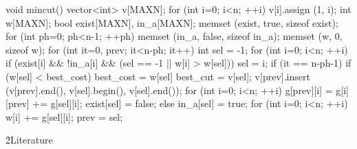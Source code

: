 void mincut() {
vector<int> v[MAXN];
for (int i=0; i<n; ++i)
v[i].assign (1, i);
int w[MAXN];
bool exist[MAXN], in_a[MAXN];
memset (exist, true, sizeof exist);
for (int ph=0; ph<n-1; ++ph) {
memset (in_a, false, sizeof in_a);
memset (w, 0, sizeof w);
for (int it=0, prev; it<n-ph; it++) {
int sel = -1;
for (int i=0; i<n; ++i)
if (exist[i] && !in_a[i] && (sel == -1 || w[i] > w[sel]))
sel = i;
if (it == n-ph-1) {
if (w[sel] < best_cost)
best_cost = w[sel] best_cut = v[sel];
v[prev].insert (v[prev].end(), v[sel].begin(), v[sel].end());
for (int i=0; i<n; ++i)
g[prev][i] = g[i][prev] += g[sel][i];
exist[sel] = false;
}
else {
in_a[sel] = true;
for (int i=0; i<n; ++i)
w[i] += g[sel][i];
prev = sel;
}
}
}
}
\endcode


\h2{Literature}

\ul{
\li {}
\li {}
}